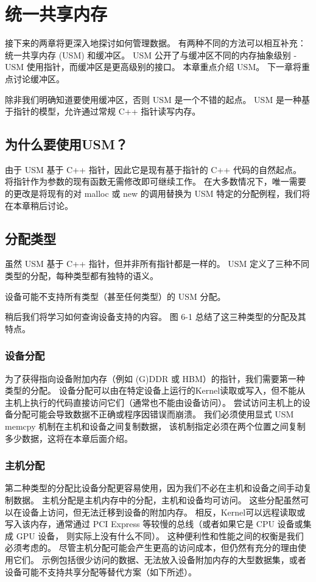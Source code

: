 \section{统一共享内存}
接下来的两章将更深入地探讨如何管理数据。 有两种不同的方法可以相互补充：统一共享内存 (USM) 和缓冲区。 
USM 公开了与缓冲区不同的内存抽象级别 - USM 使用指针，而缓冲区是更高级别的接口。 
本章重点介绍 USM。 下一章将重点讨论缓冲区。

除非我们明确知道要使用缓冲区，否则 USM 是一个不错的起点。 
USM 是一种基于指针的模型，允许通过常规 C++ 指针读写内存。

\subsection{为什么要使用USM？}
由于 USM 基于 C++ 指针，因此它是现有基于指针的 C++ 代码的自然起点。 
将指针作为参数的现有函数无需修改即可继续工作。 
在大多数情况下，唯一需要的更改是将现有的对 malloc 或 new 的调用替换为 USM 特定的分配例程，我们将在本章稍后讨论。

\subsection{分配类型}
虽然 USM 基于 C++ 指针，但并非所有指针都是一样的。 USM 定义了三种不同类型的分配，每种类型都有独特的语义。

设备可能不支持所有类型（甚至任何类型）的 USM 分配。

稍后我们将学习如何查询设备支持的内容。 图 6-1 总结了这三种类型的分配及其特点。

\subsubsection{设备分配}
为了获得指向设备附加内存（例如 (G)DDR 或 HBM）的指针，我们需要第一种类型的分配。 
设备分配可以由在特定设备上运行的Kernel读取或写入，但不能从主机上执行的代码直接访问它们（通常也不能由设备访问）。 
尝试访问主机上的设备分配可能会导致数据不正确或程序因错误而崩溃。 
我们必须使用显式 USM memcpy 机制在主机和设备之间复制数据，
该机制指定必须在两个位置之间复制多少数据，这将在本章后面介绍。

\subsubsection{主机分配}
第二种类型的分配比设备分配更容易使用，因为我们不必在主机和设备之间手动复制数据。 
主机分配是主机内存中的分配，主机和设备均可访问。 这些分配虽然可以在设备上访问，但无法迁移到设备的附加内存。 
相反，Kernel可以远程读取或写入该内存，通常通过 PCI Express 等较慢的总线（或者如果它是 CPU 设备或集成 GPU 设备，
则实际上没有什么不同）。 这种便利性和性能之间的权衡是我们必须考虑的。 
尽管主机分配可能会产生更高的访问成本，但仍然有充分的理由使用它们。 
示例包括很少访问的数据、无法放入设备附加内存的大型数据集，或者设备可能不支持共享分配等替代方案（如下所述）。

